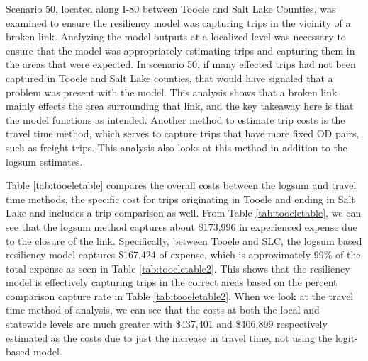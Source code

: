 \documentclass[3p, authoryear]{elsarticle} %
\begin{document}
Scenario 50, located along I-80 between Tooele and Salt Lake Counties, was
examined to ensure the resiliency model was capturing trips in the vicinity of a
broken link. Analyzing the model outputs at a localized level was necessary to
ensure that the model was appropriately estimating trips and capturing them in
the areas that were expected. In scenario 50, if many effected trips had not
been captured in Tooele and Salt Lake counties, that would have signaled that a
problem was present with the model. This analysis shows that a broken link
mainly effects the area surrounding that link, and the key takeaway here is that
the model functions as intended. Another method to estimate trip costs is the
travel time method, which serves to capture trips that have more fixed OD pairs,
such as freight trips. This analysis also looks at this method in addition to
the logsum estimates.

Table \ref{tab:tooeletable} compares the overall costs between the logsum and
travel time methods, the specific cost for trips originating in Tooele and
ending in Salt Lake and includes a trip comparison as well. From Table
\ref{tab:tooeletable}, we can see that the logsum method captures about
\$173,996 in experienced expense due to the closure of the link. Specifically,
between Tooele and SLC, the logsum based resiliency model captures \$167,424 of
expense, which is approximately 99\% of the total expense as seen in Table
\ref{tab:tooeletable2}. This shows that the resiliency model is effectively
capturing trips in the correct areas based on the percent comparison capture
rate in Table \ref{tab:tooeletable2}. When we look at the travel time method of
analysis, we can see that the costs at both the local and statewide levels are
much greater with \$437,401 and \$406,899 respectively estimated as the costs
due to just the increase in travel time, not using the logit-based model.
\end{document}
